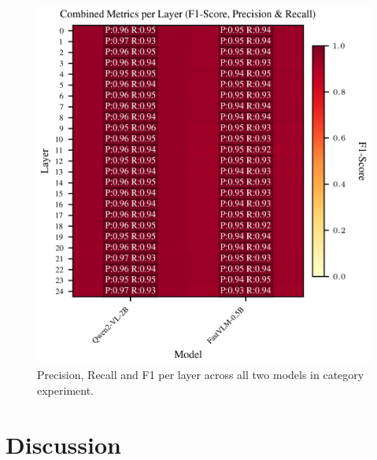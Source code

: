 \documentclass[11pt]{article}
\begin{document}
\begin{figure}[H]
    \centering
    \includegraphics[width=1\linewidth]{figures/local/_combined_exp2/combined_metrics_heatmap.png}
    \caption{Precision, Recall and F1 per layer across all two models in category experiment.}
    \label{fig:combined_metrics_per_layer_local}
\end{figure}


\section{Discussion}
\end{document}
